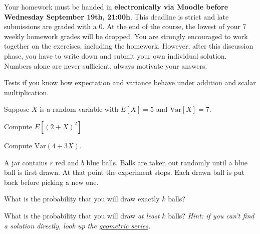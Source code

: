\documentclass[a4paper,10pt,landscape,twocolumn]{scrartcl}
\newcommand\deadline{Wednesday September 19th, 21:00h}
\begin{document}
\homeworkproblems

{\sffamily\noindent
Your homework must be handed in \textbf{electronically via Moodle before \deadline}.  This deadline is strict and late submissions are graded with a 0. At the end of the course, the lowest of your 7 weekly homework grades will be dropped. You are strongly encouraged to work together on the exercises, including the homework. However, after this discussion phase, you have to write down and submit your own individual solution. Numbers alone are never sufficient, always motivate your answers.
}



\begin{exercise}
	\begin{mycomment}
		Tests if you know how expectation and variance behave under addition and scalar multiplication.
	\end{mycomment}
	
	Suppose $X$ is a random variable with $E[X] = 5$ and $\mathrm{Var}[X] = 7$.	
	\begin{subex}[0.5pt]
	Compute $E[(2+X)^2]$
	\end{subex}	
	
	\begin{subex}[0.5pt]
	Compute $\mathrm{Var}(4+3X)$.
	\end{subex}

\end{exercise}


\begin{exercise}
A jar contains $r$ red and $b$ blue balls. Balls are taken out randomly until a blue ball is first drawn. At that point the experiment stops. Each drawn ball is put back before picking a new one.
	\begin{subex}[1pt]
		What is the probability that you will draw exactly $k$ balls? 
	\end{subex}
	
	\begin{subex}[1.5pt]
		What is the probability that you will draw \emph{at least} $k$ balls? \emph{Hint: if you can't find a solution directly, look up the \href{https://en.wikipedia.org/wiki/Geometric_series}{geometric series}.}
	\end{subex}
\end{exercise}
\end{document}
